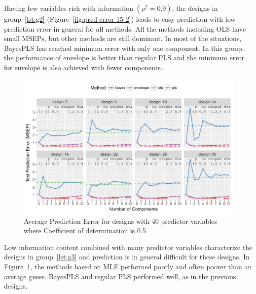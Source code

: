 \documentclass[a4paper, 11pt]{article}
\begin{document}
Having few variables rich with information $(\rho^2 = 0.9)$, the designs in group~\ref{lst:g2} (Figure~\ref{fig:pred-error-15-2}) leads to easy prediction with low prediction error in general for all methods. All the methods including OLS have small MSEPs, but other methods are still dominant. In most of the situations, BayesPLS has reached minimum error with only one component. In this group, the performance of envelope is better than regular PLS and the minimum error for envelope is also achieved with fewer components. 

\begin{figure}[!hptb]
  \centering
  \includegraphics[width = \textwidth]{pdf/prediction-error-40-1.pdf}
  \caption[Prediction Error]{Average Prediction Error for designs with 40 predictor
    variables where Coefficient of determination is 0.5}
  \label{fig:pred-error-40-1}
\end{figure}

Low information content combined with many predictor variables characterize the designs in group~\ref{lst:g3} and prediction is in general difficult for these designs. In Figure~\ref{fig:pred-error-40-1}, the methods based on MLE performed poorly and often poorer than an average guess. BayesPLS and regular PLS performed well, as in the previous designs.
\end{document}
